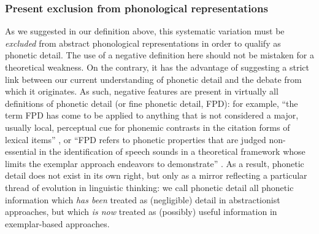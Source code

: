 \subsubsection{Present exclusion from phonological representations}\label{sec1122}
As we suggested in our definition above, this systematic variation must be \textit{excluded} from abstract phonological representations in order to qualify as phonetic detail. The use of a negative definition here should not be mistaken for a theoretical weakness. On the contrary, it has the advantage of suggesting a strict link between our current understanding of phonetic detail and the debate from which it originates. As such, negative features are present in virtually all definitions of phonetic detail (or fine phonetic detail, FPD): for example, ``the term FPD has come to be applied to anything that is not considered a major, usually local, perceptual cue for phonemic contrasts in the citation forms of lexical items'' \citep{hawkins2010phonetic}, or ``FPD refers to phonetic properties that are judged non-essential in the identification of speech sounds in a theoretical framework whose limits the exemplar approach endeavors to demonstrate'' \citep{nguyen2009dynamical}. As a result, phonetic detail does not exist in its own right, but only as a mirror reflecting a particular thread of evolution in linguistic thinking: we call phonetic detail all phonetic information which \textit{has been} treated as (negligible) detail in abstractionist approaches, but which \textit{is now} treated as (possibly) useful information in exemplar-based approaches. 

